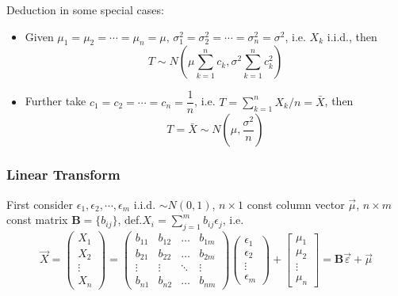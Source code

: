    Deduction in some special cases:
    \begin{itemize}
        \item Given $\mu_1=\mu_2=\cdots=\mu_n=\mu,\, \sigma^2_1=\sigma^2_2=\cdots=\sigma^2_n=\sigma^2$, i.e. $X_k$ i.i.d., then
        \begin{equation}\label{EqaDistributionOfSumOfiidNormal}
            T\sim   N(\mu\sum_{k=1}^n c_k,\sigma^2\sum_{k=1}^n c_k^2) 
        \end{equation}
        \item Further take $c_1=c_2=\cdots=c_n=\dfrac{1}{n}$, i.e. $T={\displaystyle \sum_{k=1}^n X_k /n}=\bar{X}$, then
        \begin{equation}    
            T=\bar{X}\sim N(\mu,\frac{\sigma^2}{n})    
        \end{equation}
    \end{itemize}





\subsubsection{Linear Transform}
    First consider $\epsilon_1,\epsilon_2,\cdots,\epsilon_m$ i.i.d. $\sim N(0,1)$, $n\times 1$ const column vector $\vec{\mu}$, $n\times m$ const matrix $\bm{B}=\{b_{ij}\}$, def.$X_i={\displaystyle\sum_{j=1}^m b_{ij}\epsilon_j}$, i.e.
    \begin{equation}
        \vec{X}=
        \begin{pmatrix}
            X_1\\X_2\\ \vdots\\X_n
        \end{pmatrix}
        =
        \begin{pmatrix}
            b_{11}&b_{12}&\ldots&b_{1m}\\
            b_{21}&b_{22}&\ldots&b_{2m}\\
            \vdots&\vdots&\ddots&\vdots\\
            b_{n1}&b_{n2}&\ldots&b_{nm}
        \end{pmatrix}
        \begin{pmatrix}
            \epsilon_1\\
            \epsilon_2\\
            \vdots\\
            \epsilon_m
        \end{pmatrix}
        +\begin{bmatrix}
            \mu _1\\\mu _2\\ \vdots\\\mu _n
        \end{bmatrix}=\bm{B}\vec{\varepsilon }+\vec{\mu }
    \end{equation}

